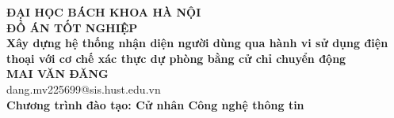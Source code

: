 \documentclass[DoAn.tex]{subfiles}
\begin{document}
\begin{titlepage}
\thispagestyle{empty}
\begin{center}

{\textbf{\large{ĐẠI HỌC BÁCH KHOA HÀ NỘI}}}\\[3.5cm]

{\textbf{\huge{ ĐỒ ÁN TỐT NGHIỆP}}}\\[1cm]
{\textbf{\Large{Xây dựng hệ thống nhận diện người dùng qua hành vi sử dụng điện thoại với cơ chế xác thực dự phòng bằng cử chỉ chuyển động}}}\\[1cm]

{\textbf{\large{MAI VĂN ĐĂNG}}}\\
{\large{dang.mv225699@sis.hust.edu.vn}}\\[0.5cm] %

{\textbf{\large{Chương trình đào tạo: Cử nhân Công nghệ thông tin
}}}\\

\vspace{3.5cm}
\begin{table}[H]
\centering
{}
\end{table}
\end{center}



\end{titlepage}
\end{document}
